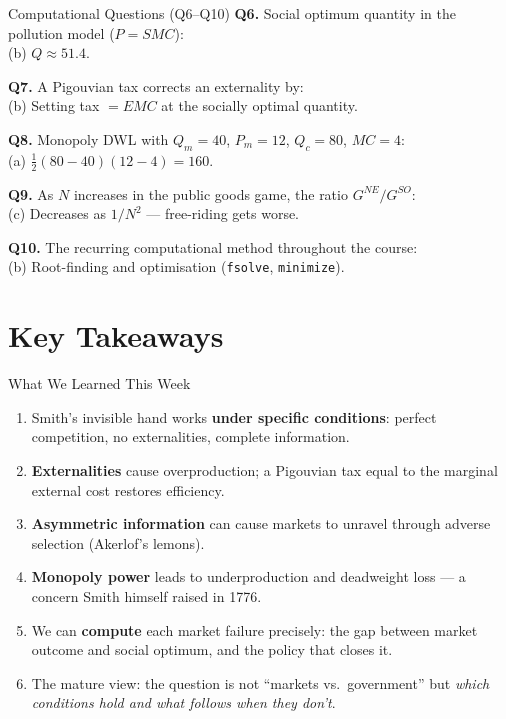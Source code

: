 \documentclass[aspectratio=169, 10pt]{beamer}
\begin{document}
\begin{frame}{Computational Questions (Q6--Q10)}
\textbf{Q6.} Social optimum quantity in the pollution model ($P = SMC$):\\
\quad (b) $Q \approx 51.4$.
\vspace{0.3em}

\textbf{Q7.} A Pigouvian tax corrects an externality by:\\
\quad (b) Setting tax $= EMC$ at the socially optimal quantity.
\vspace{0.3em}

\textbf{Q8.} Monopoly DWL with $Q_m = 40$, $P_m = 12$, $Q_c = 80$,
$MC = 4$:\\
\quad (a) $\frac{1}{2}(80-40)(12-4) = 160$.
\vspace{0.3em}

\textbf{Q9.} As $N$ increases in the public goods game, the ratio
$G^{NE}/G^{SO}$:\\
\quad (c) Decreases as $1/N^2$ --- free-riding gets worse.
\vspace{0.3em}

\textbf{Q10.} The recurring computational method throughout the course:\\
\quad (b) Root-finding and optimisation (\texttt{fsolve}, \texttt{minimize}).
\end{frame}

\section{Key Takeaways}

\begin{frame}{What We Learned This Week}
\begin{enumerate}
  \item Smith's invisible hand works \textbf{under specific conditions}:
        perfect competition, no externalities, complete information.
  \item \textbf{Externalities} cause overproduction; a Pigouvian tax
        equal to the marginal external cost restores efficiency.
  \item \textbf{Asymmetric information} can cause markets to unravel
        through adverse selection (Akerlof's lemons).
  \item \textbf{Monopoly power} leads to underproduction and deadweight
        loss --- a concern Smith himself raised in 1776.
  \item We can \textbf{compute} each market failure precisely: the gap
        between market outcome and social optimum, and the policy
        that closes it.
  \item The mature view: the question is not ``markets vs.\ government''
        but \textit{which conditions hold and what follows when they don't}.
\end{enumerate}
\end{frame}
\end{document}
